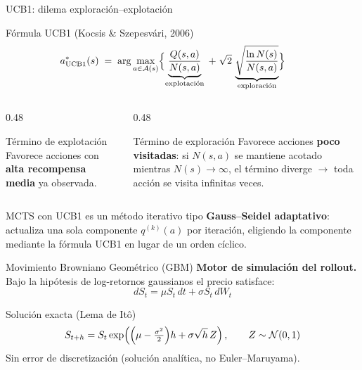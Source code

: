 \documentclass[aspectratio=169, 10pt]{beamer}
\begin{document}
\begin{frame}{UCB1: dilema exploración–explotación}
  \begin{block}{Fórmula UCB1 \footnotesize{(Kocsis \& Szepesvári, 2006)}}
    \[
      a^*_{\text{UCB1}}(s)
      \;=\;
      \arg\max_{a\in\mathcal{A}(s)}
      \Bigl\{
        \underbrace{\dfrac{Q(s,a)}{N(s,a)}}_{\text{explotación}}
        \;+\;
        \sqrt{2}\,\underbrace{\sqrt{\dfrac{\ln N(s)}{N(s,a)}}}_{\text{exploración}}
      \Bigr\}\hspace{2em}
    \]
  \end{block}

  \vspace{0.3cm}
  \begin{columns}[T]
    \begin{column}{0.48\textwidth}
      \begin{exampleblock}{Término de explotación}
        Favorece acciones con \textbf{alta recompensa media} ya observada.
      \end{exampleblock}
    \end{column}
    \begin{column}{0.48\textwidth}
      \begin{alertblock}{Término de exploración}
        Favorece acciones \textbf{poco visitadas}: si $N(s,a)$ se mantiene
        acotado mientras $N(s)\to\infty$, el término diverge
        $\to$ toda acción se visita infinitas veces.
      \end{alertblock}
    \end{column}
  \end{columns}

  \vspace{0.3cm}
  MCTS con UCB1 es un método iterativo tipo \textbf{Gauss–Seidel adaptativo}:
  actualiza una sola componente $q^{(k)}(a)$ por iteración,
  eligiendo la componente mediante la fórmula UCB1 en lugar de un orden cíclico.
\end{frame}

\begin{frame}{Movimiento Browniano Geométrico (GBM)}
  \textbf{Motor de simulación del rollout.}
  Bajo la hipótesis de log-retornos gaussianos el precio satisface:
  \[
    dS_t = \mu S_t\,dt + \sigma S_t\,dW_t
  \]

  \begin{block}{Solución exacta (Lema de Itô)}
    \[
      S_{t+h} = S_t\exp\!\left(
        \Bigl(\mu - \tfrac{\sigma^2}{2}\Bigr)h
        + \sigma\sqrt{h}\,Z
      \right), \qquad Z\sim\mathcal{N}(0,1)
    \]
    Sin error de discretización (solución analítica, no Euler–Maruyama).
  \end{block}
\end{frame}
\end{document}
